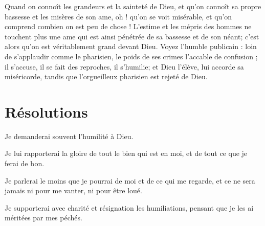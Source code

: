 \documentclass[instructions.tex]{subfiles}
\begin{document}
Quand on connoît les grandeurs et la sainteté de Dieu, et qu’on connoît sa propre bassesse et les misères de son ame, oh ! qu’on se voit misérable, et qu’on comprend combien on est peu de chose ! L’estime et les mépris des hommes ne touchent plus une ame qui est ainsi pénétrée de sa bassesse et de son néant; c’est alors qu’on est véritablement grand devant Dieu. Voyez l’humble publicain : loin de s’applaudir comme le pharisien, le poids de ses crimes l’accable de confusion ; il s’accuse, il se fait des reproches, il s’humilie; et Dieu l’élève, lui accorde sa miséricorde, tandis que l’orgueilleux pharisien est rejeté de Dieu.
 
\section{Résolutions}
 
\primo Je demanderai souvent l’humilité à Dieu.

\secundo Je lui rapporterai la gloire de tout le bien qui est en moi, et de tout ce que je ferai de bon.

\tertio Je parlerai le moins que je pourrai de moi et de ce qui me regarde, et ce ne sera jamais ni pour me vanter, ni pour être loué.

\quarto Je supporterai avec charité et résignation les humiliations, pensant que je les ai méritées par mes péchés.
 
 
\end{document}
